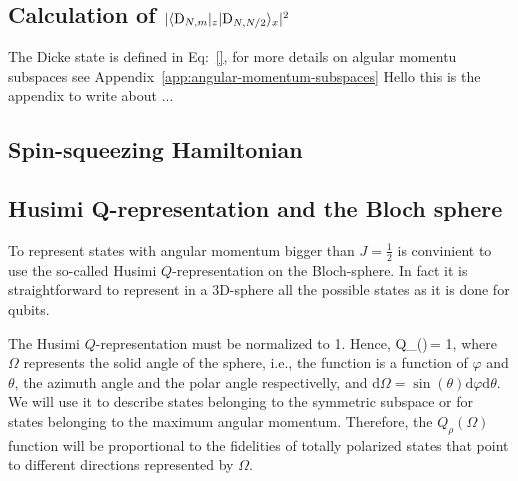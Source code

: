 \subsection{Calculation of $|\langle{\ensuremath{\textnormal{D}_{N,m}}}\vert{_z}\vert{\ensuremath{\textnormal{D}_{N,N/2}}}\rangle_x|^2$}
\label{app:calculation-dicke-overlap}

The Dicke state is defined in Eq:~\eqref{}, for more details on algular momentu subspaces see Appendix~\ref{app:angular-momentum-subspaces}
Hello this is the appendix to write about ...

\subsection{Spin-squeezing Hamiltonian}
\label{app:spin-squeezing-hamiltonian}

\subsection{Husimi Q-representation and the Bloch sphere}
\label{app:husimi-representation}

To represent states with angular momentum bigger than $J=\frac{1}{2}$ is convinient to use the so-called Husimi $Q$-representation \cite{} on the Bloch-sphere.
In fact it is straightforward to represent in a 3D-sphere all the possible states as it is done for qubits.

The Husimi $Q$-representation must be normalized to 1.
Hence,
\be
  \label{eq:ap2-husimi-integral-to-one}
  \int Q_\rho(\Omega)\,\Omega = 1,
\ee
where $\Omega$ represents the solid angle of the sphere, i.e., the function is a function of $\varphi$ and $\theta$, the azimuth angle and the polar angle respectivelly, and $\text{d}\Omega= \sin(\theta)\text{d}\varphi\text{d}\theta$.
We will use it to describe states belonging to the symmetric subspace or for states belonging to the maximum angular momentum.
Therefore, the $Q_\rho(\Omega)$ function will be proportional to the fidelities of totally polarized states that point to different directions represented by $\Omega$.

